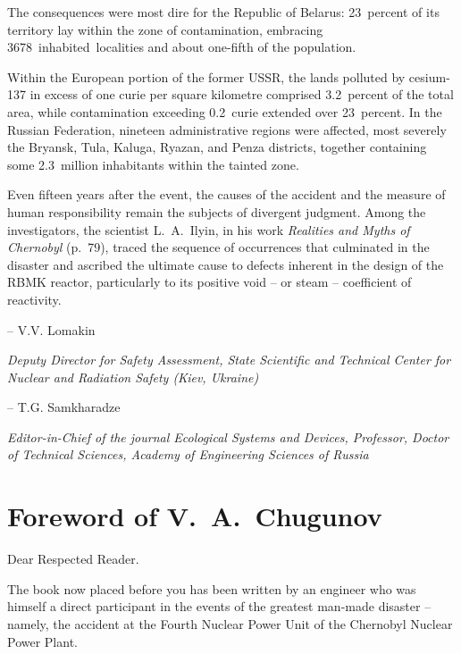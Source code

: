 \documentclass[openright]{bookest}
\begin{document}
The consequences were most dire for the Republic of Belarus: 23~percent of its territory lay within the zone of contamination, embracing \num{3678}~inhabited~localities and about one-fifth of the population.

Within the European portion of the former USSR, the lands polluted by cesium-137 in excess of one curie per square kilometre comprised \num{3.2}~percent of the total area, while contamination exceeding \num{0.2}~curie extended over \num{23}~percent. In the Russian Federation, nineteen administrative regions were affected, most severely the Bryansk, Tula, Kaluga, Ryazan, and Penza districts, together containing some \num{2.3}~million inhabitants within the tainted zone.

Even fifteen years after the event, the causes of the accident and the measure of human responsibility remain the subjects of divergent judgment. Among the investigators, the scientist L.~A.~Ilyin, in his work \textit{Realities and Myths of Chernobyl} (p.~79), traced the sequence of occurrences that culminated in the disaster and ascribed the ultimate cause to defects inherent in the design of the RBMK reactor, particularly to its positive void -- or steam -- coefficient of reactivity.

\begin{flushright}\small{
-- V.V. Lomakin

\textit{Deputy Director for Safety Assessment, State Scientific and Technical Center for Nuclear and Radiation Safety (Kiev, Ukraine)}
}\end{flushright}

\begin{flushright}\small{
-- T.G. Samkharadze

\textit{Editor-in-Chief of the journal Ecological Systems and Devices, Professor, Doctor of Technical Sciences, Academy of Engineering Sciences of Russia}
}\end{flushright}

\chapter*{Foreword of V.~A.~Chugunov}

Dear Respected Reader.

The book now placed before you has been written by an engineer who was himself a direct participant in the events of the greatest man-made disaster -- namely, the accident at the Fourth Nuclear Power Unit of the Chernobyl Nuclear Power Plant.
\end{document}
